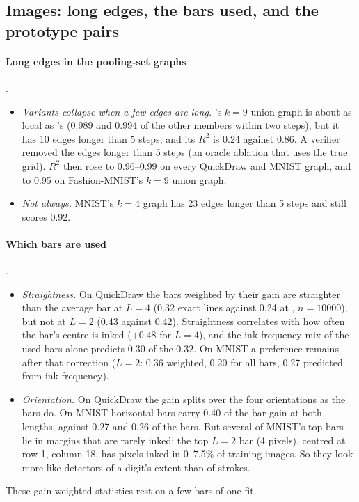 \subsection{Images: long edges, the bars used, and the prototype pairs}\label{app:interp-img-more}

\paragraph{Long edges in the pooling-set graphs} .
\begin{itemize}
\item \emph{Variants collapse when a few edges are long.} 's $k=9$ union graph is about as local as 's (0.989 and 0.994 of the other members within two steps), but it has 10 edges longer than 5 steps, and its $R^2$ is 0.24 against 0.86. A verifier removed the edges longer than 5 steps (an oracle ablation that uses the true grid). $R^2$ then rose to 0.96--0.99 on every QuickDraw and MNIST graph, and to 0.95 on Fashion-MNIST's $k=9$ union graph.
\item \emph{Not always.} MNIST's $k=4$ graph has 23 edges longer than 5 steps and still scores 0.92.
\end{itemize}

\paragraph{Which bars are used} .
\begin{itemize}
\item \emph{Straightness.} On QuickDraw the bars weighted by their gain are straighter than the average bar at $L=4$ (0.32 exact lines against 0.24 at , $n=10000$), but not at $L=2$ (0.43 against 0.42). Straightness correlates with how often the bar's centre is inked ($+0.48$ for $L=4$), and the ink-frequency mix of the used bars alone predicts 0.30 of the 0.32. On MNIST a preference remains after that correction ($L=2$: 0.36 weighted, 0.20 for all bars, 0.27 predicted from ink frequency).
\item \emph{Orientation.} On QuickDraw the gain splits over the four orientations as the bars do. On MNIST horizontal bars carry 0.40 of the bar gain at both lengths, against 0.27 and 0.26 of the bars. But several of MNIST's top bars lie in margins that are rarely inked; the top $L=2$ bar (4 pixels), centred at row 1, column 18, has pixels inked in 0--7.5\% of training images. So they look more like detectors of a digit's extent than of strokes.
\end{itemize}
These gain-weighted statistics rest on a few bars of one fit.

